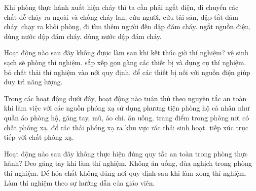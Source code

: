 \begin{ex}
Khi phòng thực hành xuất hiện cháy thì ta cần phải
\choice
{\True ngắt điện, di chuyển các chất dễ cháy ra ngoài và chống cháy lan, cứu người, cứu tài sản, dập tắt đám cháy.}
{chạy ra khỏi phòng, đi tìm thêm người đến dập đám cháy.}
{ngắt nguồn điện, dùng nước dập đám cháy.}
{dùng nước dập đám cháy.}
\end{ex}

\begin{ex}
Hoạt động nào sau đây không được làm sau khi kết thúc giờ thí nghiệm?
\choice
{vệ sinh sạch sẽ phòng thí nghiệm.}
{sắp xếp gọn gàng các thiết bị và dụng cụ thí nghiệm.}
{bỏ chất thải thí nghiệm vào nới quy định.}
{\True để các thiết bị nối với nguồn điện giúp duy trì năng lượng.}
\end{ex}

\begin{ex}
Trong các hoạt động dưới đây, hoạt động nào tuân thủ theo nguyên tắc an toàn khi làm việc với các nguồn phóng xạ
\choice
{\True sử dụng phương tiện phòng hộ cá nhân như quần áo phòng hộ, găng tay, mũ, áo chì.}
{ăn uống, trang điểm trong phòng nơi có chất phóng xạ.}
{đổ rác thải phóng xạ ra khu vực rác thải sinh hoạt.}
{tiếp xúc trục tiếp với chất phóng xạ.}
\end{ex}

\begin{ex}
Hoạt động nào sau đây không thực hiện đúng quy tắc an toàn trong phòng thực hành?
\choice
{Đeo găng tay khi làm thí nghiệm.}
{Không ăn uống, đùa nghịch trong phòng thí nghiệm.}
{\True Để hóa chất không đúng nơi quy định sau khi làm xong thí nghiệm.}
{Làm thí nghiệm theo sự hướng dẫn của giáo viên.}
\end{ex}

